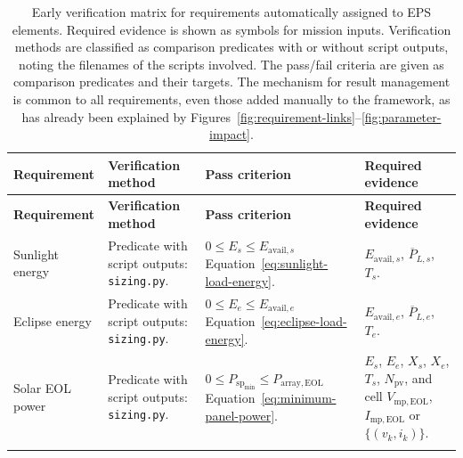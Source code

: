 \begingroup
\footnotesize
\setlength{\tabcolsep}{4pt}
\setlength{\parskip}{0pt}
\setlength{\LTpre}{0.4\baselineskip}
\setlength{\LTpost}{0.4\baselineskip}
\setlength{\LTcapwidth}{\linewidth}
\renewcommand{\arraystretch}{1.08}
\setlength{\ReportTableBodyWidth}{\dimexpr\linewidth-6\tabcolsep\relax}
\begin{longtable}{@{}P{0.18\ReportTableBodyWidth}P{0.21\ReportTableBodyWidth}P{0.29\ReportTableBodyWidth}P{0.32\ReportTableBodyWidth}@{}}
\caption{Early verification matrix for requirements automatically assigned to EPS elements. Required evidence is shown as symbols for mission inputs. Verification methods are classified as comparison predicates with or without script outputs, noting the filenames of the scripts involved. The pass/fail criteria are given as comparison predicates and their targets. The mechanism for result management is common to all requirements, even those added manually to the framework, as has already been explained by Figures~\ref{fig:requirement-links}--\ref{fig:parameter-impact}.}\label{tab:automatic-eps-verification}\\
\toprule
\textbf{Requirement} & \textbf{Verification method} & \textbf{Pass criterion} & \textbf{Required evidence} \\
\midrule
\endfirsthead
\toprule
\textbf{Requirement} & \textbf{Verification method} & \textbf{Pass criterion} & \textbf{Required evidence} \\
\midrule
\endhead
\bottomrule
\endfoot
Sunlight energy & Predicate with script outputs: \texttt{sizing.py}. & $0\leq E_s\leq E_{\mathrm{avail},s}$ \newline Equation~\eqref{eq:sunlight-load-energy}. & $E_{\mathrm{avail},s}$, $\overline P_{L,s}$, $T_s$. \\
\addlinespace[4pt]
Eclipse energy & Predicate with script outputs: \texttt{sizing.py}. & $0\leq E_e\leq E_{\mathrm{avail},e}$ \newline Equation~\eqref{eq:eclipse-load-energy}. & $E_{\mathrm{avail},e}$, $\overline P_{L,e}$, $T_e$. \\
\addlinespace[4pt]
Solar EOL power & Predicate with script outputs: \texttt{sizing.py}. & $0\leq P_{\mathrm{sp}_{\min}}\leq P_{\mathrm{array,EOL}}$ \newline Equation~\eqref{eq:minimum-panel-power}. & $E_s$, $E_e$, $X_s$, $X_e$, $T_s$, $N_{\mathrm{pv}}$, and cell $V_{\mathrm{mp,EOL}}$, $I_{\mathrm{mp,EOL}}$ or $\{(v_k,i_k)\}$. \\
\addlinespace[4pt]

\end{longtable}
